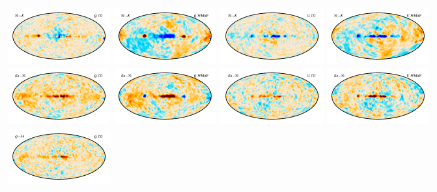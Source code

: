 \documentclass[twocolumn]{../../common/aa}
\begin{document}
\begin{figure}
	\centering
	\includegraphics[width=0.24\textwidth]{figures/K30_deltaQ.pdf}
	\includegraphics[width=0.24\textwidth]{figures/K30_W_deltaQ.pdf}
	\includegraphics[width=0.24\textwidth]{figures/K30_deltaU.pdf}
	\includegraphics[width=0.24\textwidth]{figures/K30_W_deltaU.pdf}\\
	\includegraphics[width=0.24\textwidth]{figures/30Ka_deltaQ.pdf}
	\includegraphics[width=0.24\textwidth]{figures/30Ka_W_deltaQ.pdf}
	\includegraphics[width=0.24\textwidth]{figures/30Ka_deltaU.pdf}
	\includegraphics[width=0.24\textwidth]{figures/30Ka_W_deltaU.pdf}\\
	\includegraphics[width=0.24\textwidth]{figures/44Q_deltaQ.pdf}

\end{figure}
\end{document}
